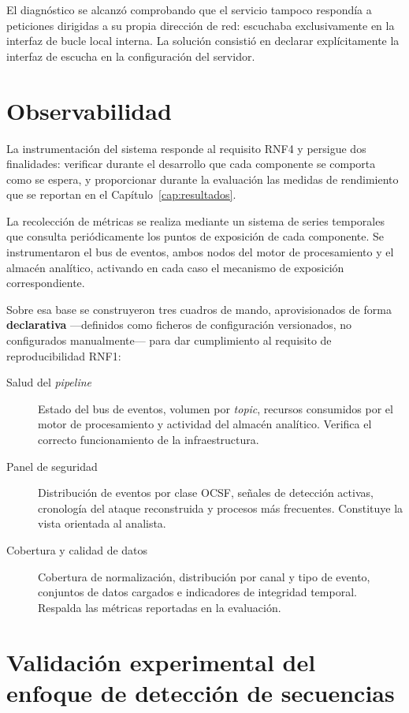 El diagnóstico se alcanzó comprobando que el servicio tampoco respondía a peticiones dirigidas
a su propia dirección de red: escuchaba exclusivamente en la interfaz de bucle local interna.
La solución consistió en declarar explícitamente la interfaz de escucha en la configuración
del servidor.

\section{Observabilidad}

La instrumentación del sistema responde al requisito RNF4 y persigue dos finalidades:
verificar durante el desarrollo que cada componente se comporta como se espera, y
proporcionar durante la evaluación las medidas de rendimiento que se reportan en el
Capítulo~\ref{cap:resultados}.

La recolección de métricas se realiza mediante un sistema de series temporales que consulta
periódicamente los puntos de exposición de cada componente. Se instrumentaron el bus de
eventos, ambos nodos del motor de procesamiento y el almacén analítico, activando en cada
caso el mecanismo de exposición correspondiente.

Sobre esa base se construyeron tres cuadros de mando, aprovisionados de forma
\textbf{declarativa} —definidos como ficheros de configuración versionados, no configurados
manualmente— para dar cumplimiento al requisito de reproducibilidad RNF1:

\begin{description}
    \item[Salud del \textit{pipeline}] Estado del bus de eventos, volumen por \textit{topic},
    recursos consumidos por el motor de procesamiento y actividad del almacén analítico.
    Verifica el correcto funcionamiento de la infraestructura.
    \item[Panel de seguridad] Distribución de eventos por clase OCSF, señales de detección
    activas, cronología del ataque reconstruida y procesos más frecuentes. Constituye la
    vista orientada al analista.
    \item[Cobertura y calidad de datos] Cobertura de normalización, distribución por canal y
    tipo de evento, conjuntos de datos cargados e indicadores de integridad temporal. Respalda
    las métricas reportadas en la evaluación.
\end{description}

\section{Validación experimental del enfoque de detección de secuencias}
\label{sec:validacion_cep}

